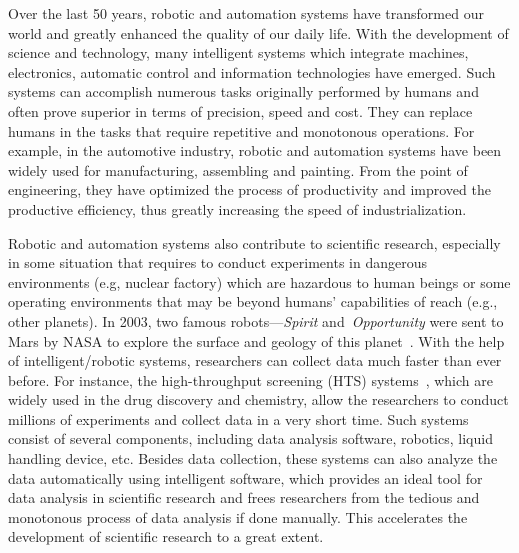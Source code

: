 Over the last 50 years, robotic and automation systems have transformed our world and greatly enhanced the quality of our daily life. With the development of science and technology, many intelligent systems which integrate machines, electronics, automatic control and information technologies have emerged. Such systems can accomplish numerous tasks originally performed by humans and often prove superior in terms of precision, speed and cost. They can replace humans in the tasks that require repetitive and monotonous operations. For example, in the automotive industry, robotic and automation systems have been widely used for manufacturing, assembling and painting. From the point of engineering, they have optimized the process of productivity and improved the productive efficiency, thus greatly increasing the speed of industrialization. 

Robotic and automation systems also contribute to scientific research, especially in some situation that requires to conduct experiments in dangerous environments (e.g, nuclear factory) which are hazardous to human beings or some operating environments that may be beyond humans' capabilities of reach (e.g., other planets). In 2003, two famous robots---\textit{Spirit} and~\textit{Opportunity} were sent to Mars by NASA to explore the surface and geology of this planet~\cite{Grotzinger:Sci:2014}. With the help of intelligent/robotic systems, researchers can collect data much faster than ever before. For instance, the high-throughput screening (HTS) systems~\cite{Hertzberg2000}, which are widely used in the drug discovery and chemistry, allow the researchers to conduct millions of experiments and collect data in a very short time. Such systems consist of several components, including data analysis software, robotics, liquid handling device, etc. Besides data collection, these systems can also analyze the data automatically using intelligent software, which provides an ideal tool for data analysis in scientific research and frees researchers from the tedious and monotonous process of data analysis if done manually. This accelerates the development of scientific research to a great extent. 

